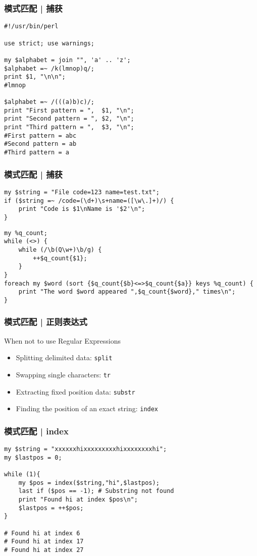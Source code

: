 \begin{frame}[fragile]
  \frametitle{模式匹配 | 捕获}
  \vspace{-0.6em}
\begin{lstlisting}
#!/usr/bin/perl

use strict; use warnings;

my $alphabet = join "", 'a' .. 'z';
$alphabet =~ /k(lmnop)q/;
print $1, "\n\n";
#lmnop

$alphabet =~ /(((a)b)c)/;
print "First pattern = ",  $1, "\n";
print "Second pattern = ", $2, "\n";
print "Third pattern = ",  $3, "\n";
#First pattern = abc
#Second pattern = ab
#Third pattern = a
\end{lstlisting}
\end{frame}

\begin{frame}[fragile]
  \frametitle{模式匹配 | 捕获}
\begin{lstlisting}[basicstyle=\small\tt]
my $string = "File code=123 name=test.txt";
if ($string =~ /code=(\d+)\s+name=([\w\.]+)/) {
    print "Code is $1\nName is '$2'\n";
}
\end{lstlisting}
\begin{lstlisting}[basicstyle=\small\tt]
my %q_count;
while (<>) {
    while (/\b(Q\w+)\b/g) {
        ++$q_count{$1};
    }
}
foreach my $word (sort {$q_count{$b}<=>$q_count{$a}} keys %q_count) {
    print "The word $word appeared ",$q_count{$word}," times\n";
}
\end{lstlisting}
\end{frame}

\begin{frame}
  \frametitle{模式匹配 | 正则表达式}
  \begin{block}{When not to use Regular Expressions}
    \begin{itemize}
      \item Splitting delimited data: \texttt{split}
      \item Swapping single characters: \texttt{tr}
      \item Extracting fixed position data: \texttt{substr}
      \item Finding the position of an exact string: \texttt{index}
    \end{itemize}
  \end{block}
\end{frame}

\begin{frame}[fragile]
  \frametitle{模式匹配 | index}
\begin{lstlisting}
my $string = "xxxxxxhixxxxxxxxxhixxxxxxxxhi";
my $lastpos = 0;

while (1){
    my $pos = index($string,"hi",$lastpos);
    last if ($pos == -1); # Substring not found
    print "Found hi at index $pos\n";
    $lastpos = ++$pos;
}

# Found hi at index 6
# Found hi at index 17
# Found hi at index 27
\end{lstlisting}
\end{frame}

